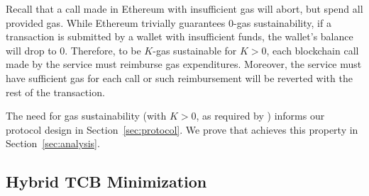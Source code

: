 Recall that a call made in Ethereum with insufficient gas will abort, but spend all provided gas. While Ethereum trivially guarantees 0-gas sustainability, if a transaction is submitted by a wallet with insufficient funds, the wallet's balance will drop to 0.
Therefore, to be $K$-gas sustainable for $K > 0$, each blockchain call made by the service must reimburse gas expenditures.
Moreover, the service must have sufficient gas for each call or such reimbursement will be reverted with the rest of the transaction.

The need for gas sustainability (with $K > 0$, as required by \tc) informs our protocol design in Section~\ref{sec:protocol}. We prove that \tc achieves this property in Section~\ref{sec:analysis}.

\subsection{Hybrid TCB Minimization}
\label{sec:tcb-hybridization}



